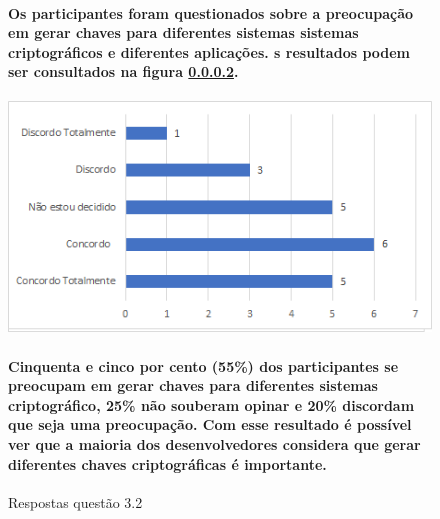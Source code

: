 \begin{figure}[!t]
\centering
\paragraph{
Os participantes foram questionados sobre a preocupação em gerar chaves para diferentes sistemas sistemas criptográficos e diferentes aplicações. s resultados podem ser consultados na figura \ref{fig:3.2}.}
\includegraphics[scale=0.7]{figuras das questoes/3.2.png}
\caption{Respostas questão 3.2}

\paragraph{
Cinquenta e cinco por cento (55{\%}) dos participantes se preocupam em gerar chaves para diferentes sistemas criptográfico, 25{\%} não souberam opinar e 20{\%} discordam que seja uma preocupação. Com esse resultado é possível ver que a maioria dos desenvolvedores considera que gerar diferentes chaves criptográficas é importante.
}

\label{fig:3.2}
\end{figure}
